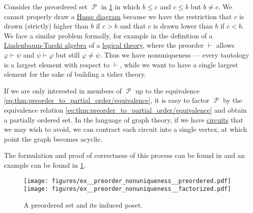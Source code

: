 \begin{example}\label{ex:preorder_nonuniqueness}
  Consider the preordered set \( \mscrP \) in \cref{fig:ex:preorder_nonuniqueness} in which \( b \leq c \) and \( c \leq b \) but \( b \neq c \). We cannot properly draw a \hyperref[def:hasse_diagram]{Hasse diagram} because we have the restriction that \( c \) is drawn (strictly) higher than \( b \) if \( c > b \) and that \( c \) is drawn lower than \( b \) if \( c < b \). We face a similar problem formally, for example in the definition of a \hyperref[def:lindenbaum_tarski_algebra]{Lindenbaum-Tarski algebra} of a \hyperref[def:first_order_theory]{logical theory}, where the preorder \( \vdash \) allows \( \varphi \vdash \psi \) and \( \psi \vdash \varphi \) but still \( \varphi \neq \psi \). Thus we have nonuniqueness --- every tautology is a largest element with respect to \( \vdash \), while we want to have a single largest element for the sake of building a tidier theory.

  If we are only interested in members of \( \mscrP \) up to the equivalence \eqref{eq:thm:preorder_to_partial_order/equivalence}, it is easy to factor \( \mscrP \) by the equivalence relation \eqref{eq:thm:preorder_to_partial_order/equivalence} and obtain a partially ordered set. In the language of graph theory, if we have \hyperref[def:graph_paths/directed_path]{circuits} that we may wish to avoid, we can contract each circuit into a single vertex, at which point the graph becomes acyclic.

  The formulation and proof of correctness of this process can be found in  and an example can be found in \cref{fig:ex:preorder_nonuniqueness}.

  \begin{figure}
    \hfill
    \texttt{[image: figures/ex\_\_preorder\_nonuniqueness\_\_preordered.pdf]}
    \hfill
    \texttt{[image: figures/ex\_\_preorder\_nonuniqueness\_\_factorized.pdf]}
    \hfill
    \hfill
    \caption{A preordered set and its induced poset.}
    \label{fig:ex:preorder_nonuniqueness}
  \end{figure}
\end{example}

